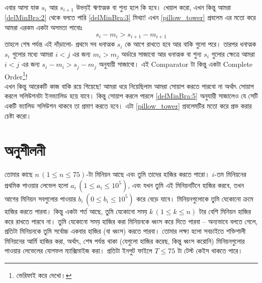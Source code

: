 \begin{solution}
এবার আসা যাক $s_i$ আর $s_{i+1}$ উভয়ই ঋণাত্মক বা শুন্য হলে কি হবে। খেয়াল করো, এখন কিন্তু আমরা \eqref{delMinBra:2} থেকে বলতে পারি \eqref{delMinBra:3} মিথ্যা! এখন \ref{pillow_tower} প্রবলেম এর মতো করে আমরা এরকম একটা অসমতা পাবোঃ
\begin{equation}
  s_i - m_i > s_{i+1} - m_{i+1} \label{delMinBra:5}
\end{equation}
তাহলে শেষ পর্যন্ত এই দাঁড়ালো- প্রথমে সব ধনাত্মক $s_i$ কে আগে রাখতে হবে আর বাকি গুলো পরে। তারপর ধনাত্মক $s_i$ গুলোর মধ্যে আমরা $i < j$ এর জন্য $m_i > m_j$ অর্ডারে সাজাবো আর ধনাত্মক বা শুন্য $s_i$ গুলোর ক্ষেত্রে আমরা $i < j$ এর জন্য $s_i - m_i > s_j - m_j$ অনুযায়ী সাজাবো। এই Comparator টা কিন্তু একটা Complete Order\footnote{ভেরিফাই করে দেখো।}!\\
এখন কিন্তু আরেকটি কাজ বাকি রয়ে গিয়েছে! আমরা ধরে নিয়েছিলাম আমরা সোয়াপ করতে পারবো না অর্থাৎ সোয়াপ করলে সলিউশনটা ইনভ্যালিড হয়ে যাবে। কিন্তু সোয়াপ করলে পারলে \eqref{delMinBra:5} অনুযায়ী সাজালেও যে সেটি একটি ভ্যালিড সলিউশন থাকবে তা প্রমাণ করতে হবে। এটা \ref{pillow_tower} প্রবলেমটির মতো করে প্রভ করার চেষ্টা করো।
\end{solution}

\section{অনুশীলনী}

\begin{exercise}
তোমার কাছে $n \, (1 \le n \le 75)$-টা মিনিয়ন আছে এবং তুমি তাদের হাজির করতে পারো। $i$-তম মিনিয়নের প্রথমিক পাওয়ার লেভেল হলো $a_i \, (1 \le a_i \le 10^5)$, এবং যখন তুমি এই মিনিয়নটিনে হাজির করবে, তখন আগের মিনিয়ন সবগুলোর পাওয়ার $b_i \, (0 \le b_i \le 10^5)$ করে বেড়ে যাবে। মিনিয়নগুলোকে তুমি যেকোনো ক্রমে হাজির করতে পারবা। কিন্তু একটা শর্ত আছে, তুমি যেকোনো সময় $k \, (1 \le k \le n)$ টার বেশি মিনিয়ন হাজির করে রাখতে পারবে না। তুমি যেকোনো সময় হাজির করা মিনিয়নকে ধ্বংস করে দিতে পারবা -- অন্যভাবে বলতে গেলে, প্রতিটা মিনিয়নকে তুমি সর্বোচ্চ একবার হাজির (বা ধ্বংস) করতে পারবা। তোমার লক্ষ্য হলো সবচাইতে শক্তিশালী মিনিয়নের আর্মি হাজির করা, অর্থাৎ, শেষ পর্যন্ত থাকা (যেগুলো হাজির করেছ, কিন্তু ধ্বংস করোনি) মিনিয়নগুলোর পাওয়ার লেভেলের যোগফল ম্যাক্সিমাইজ করা। প্রতিটা ইনপুট ফাইলে $T \le 75$ টা টেস্ট কেইস থাকতে পারে।
\end{exercise}

